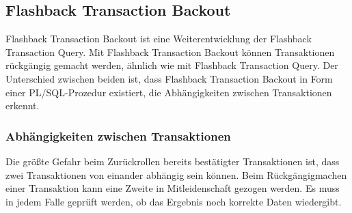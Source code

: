       \subsection{Flashback Transaction Backout}
        Flashback Transaction Backout ist eine Weiterentwicklung der Flashback Transaction Query. Mit Flashback Transaction Backout können Transaktionen rückgängig gemacht werden, ähnlich wie mit Flashback Transaction Query. Der Unterschied zwischen beiden ist, dass Flashback Transaction Backout in Form einer PL/SQL-Prozedur existiert, die Abhängigkeiten zwischen Transaktionen erkennt.
        \subsubsection{Abhängigkeiten zwischen Transaktionen}
          Die größte Gefahr beim Zurückrollen bereits bestätigter Transaktionen ist, dass zwei Transaktionen von einander abhängig sein können. Beim Rückgängigmachen einer Transaktion kann eine Zweite in Mitleidenschaft gezogen werden. Es muss in jedem Falle geprüft werden, ob das Ergebnis noch korrekte Daten wiedergibt.

